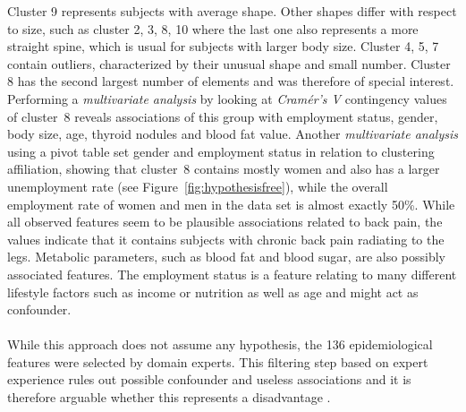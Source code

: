 \documentclass[journal]{style/vgtc} 			          %
\begin{document}
Cluster 9 represents subjects with average shape.
%
Other shapes differ with respect to size, such as cluster 2, 3, 8, 10 where the last one also represents a more straight spine, which is usual for subjects with larger body size.
%
Cluster 4, 5, 7 contain outliers, characterized by their unusual shape and small number.
%
Cluster 8 has the second largest number of elements and was therefore of special interest.
%
Performing a \emph{multivariate analysis} by looking at \emph{Cram\'{e}r's V} contingency values of cluster~8 reveals associations of this group with employment status, gender, body size, age, thyroid nodules and blood fat value.
%
Another \emph{multivariate analysis} using a pivot table set gender and employment status in relation to clustering affiliation, showing that cluster~8 contains mostly women and also has a larger unemployment rate (see Figure~\ref{fig:hypothesisfree}), while the overall employment rate of women and men in the data set is almost exactly 50\%.
%
While all observed features seem to be plausible associations related to back pain, the values indicate that it contains subjects with chronic back pain radiating to the legs.
%
Metabolic parameters, such as blood fat and blood sugar, are also possibly associated features.
The employment status is a feature relating to many different lifestyle factors such as income or nutrition as well as age and might act as confounder.
\\\\
While this approach does not assume any hypothesis, the 136 epidemiological features were selected by domain experts. %
%
This filtering step based on expert experience rules out possible confounder and useless associations and it is therefore arguable whether this represents a disadvantage \cite{Wiley2008}.
%
\end{document}
